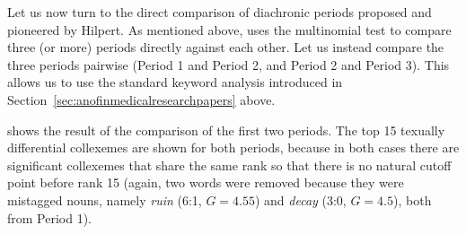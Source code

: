 Let us now turn to the direct comparison of diachronic  periods proposed and pioneered by Hilpert. As mentioned above, \citet{hilpert_germanic_2008} uses the multinomial test to compare three (or more) periods directly against each other. Let us instead compare the three periods pairwise (Period 1 and Period 2, and Period 2 and Period 3). This allows us to use the standard keyword  analysis introduced in Section~\ref{sec:anofinmedicalresearchpapers} above.

 shows the result of the comparison of the first two periods. The top 15 texually differential collexemes  are shown for both periods, because in both cases there are significant collexemes that share the same rank so that there is no natural cutoff point before rank 15 (again, two words were removed because they were mistagged nouns,  namely \textit{ruin} (6:1, $G = 4.55$) and \textit{decay} (3:0, $G = 4.5$), both from Period 1).

